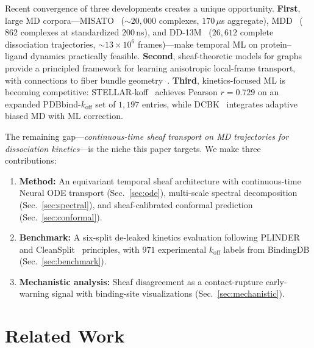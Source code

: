 \documentclass{article}
\begin{document}
Recent convergence of three developments creates a unique opportunity.
\textbf{First}, large MD corpora---MISATO~\citep{siebenmorgen2024misato}
(${\sim}20{,}000$ complexes, $170\,\mu$s aggregate),
MDD~\citep{jiang2024mdd} ($862$ complexes at standardized $200\,$ns),
and DD-13M~\citep{wang2025dd13m} ($26{,}612$ complete dissociation
trajectories, ${\sim}13\times10^6$ frames)---make temporal ML on
protein--ligand dynamics practically feasible.
\textbf{Second}, sheaf-theoretic models for graphs~\citep{bodnar2022neural,
hansen2019spectral} provide a principled framework for learning
anisotropic local-frame transport, with connections to fiber bundle
geometry~\citep{barbero2022sheaf}.
\textbf{Third}, kinetics-focused ML is becoming competitive:
STELLAR-koff~\citep{liu2025stellar} achieves Pearson $r{=}0.729$ on
an expanded PDBbind-$k_\text{off}$ set of $1{,}197$ entries, while
DCBK~\citep{kokh2025dcbk} integrates adaptive biased MD with ML
correction.

The remaining gap---\emph{continuous-time sheaf transport on MD
trajectories for dissociation kinetics}---is the niche this paper
targets.  We make three contributions:

\begin{enumerate}[leftmargin=*,noitemsep]
\item \textbf{Method:} An equivariant temporal sheaf architecture
  with continuous-time Neural ODE transport (Sec.~\ref{sec:ode}),
  multi-scale spectral decomposition (Sec.~\ref{sec:spectral}), and
  sheaf-calibrated conformal prediction (Sec.~\ref{sec:conformal}).

\item \textbf{Benchmark:} A six-split de-leaked kinetics evaluation
  following PLINDER~\citep{durairaj2024plinder} and
  CleanSplit~\citep{li2025cleansplit} principles, with $971$
  experimental $k_\text{off}$ labels from BindingDB
  (Sec.~\ref{sec:benchmark}).

\item \textbf{Mechanistic analysis:} Sheaf disagreement as a
  contact-rupture early-warning signal with binding-site
  visualizations (Sec.~\ref{sec:mechanistic}).
\end{enumerate}

\section{Related Work}
\label{sec:related}
\end{document}
